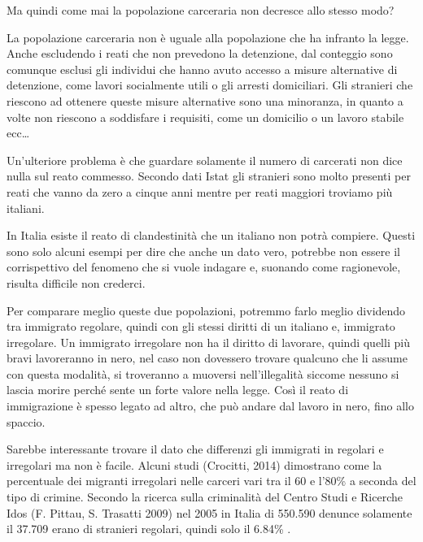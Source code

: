 \documentclass[12pt]{book} %
\begin{document}
Ma quindi come mai la popolazione carceraria non decresce allo stesso modo?

La popolazione carceraria non è uguale alla popolazione che ha infranto la legge. Anche escludendo i reati che non
prevedono la detenzione, dal conteggio sono comunque esclusi gli individui che hanno avuto accesso a misure alternative di
detenzione, come lavori socialmente utili o gli arresti domiciliari. Gli stranieri che riescono ad ottenere queste
misure alternative sono una minoranza, in quanto a volte non riescono a soddisfare i requisiti, come un domicilio o un lavoro stabile ecc…

Un'ulteriore problema è che guardare solamente il numero di carcerati non dice nulla sul reato commesso. Secondo dati Istat gli stranieri sono molto presenti per reati che vanno da zero a cinque anni mentre per reati maggiori troviamo più italiani.

In Italia esiste il reato di clandestinità che un italiano non potrà compiere. 
Questi sono solo alcuni esempi per dire che anche un dato vero, potrebbe non essere il corrispettivo del fenomeno che si vuole indagare e, suonando come ragionevole, risulta difficile non crederci.

Per comparare meglio queste due popolazioni, potremmo farlo meglio dividendo tra immigrato regolare, quindi con gli stessi diritti di un italiano e, immigrato irregolare. Un immigrato irregolare non ha il diritto di lavorare, quindi quelli più
bravi lavoreranno in nero, nel caso non dovessero trovare qualcuno che li assume con questa modalità, si troveranno a muoversi nell'illegalità siccome nessuno si lascia morire perché sente un forte valore nella legge. Così il reato di immigrazione è spesso legato ad altro, che può andare dal lavoro in nero, fino allo spaccio. 

Sarebbe interessante trovare il dato che differenzi gli immigrati in regolari e irregolari ma non è facile. Alcuni studi
(Crocitti,
2014) dimostrano come la percentuale dei migranti irregolari nelle carceri vari tra il 60 e l'80\% a
seconda del tipo di crimine. Secondo la ricerca sulla criminalità del Centro Studi e Ricerche Idos (F. Pittau, S.
Trasatti 2009) nel 2005 in Italia di 550.590 denunce solamente il 37.709 erano di stranieri regolari, quindi solo il
6.84\% .
\end{document}
